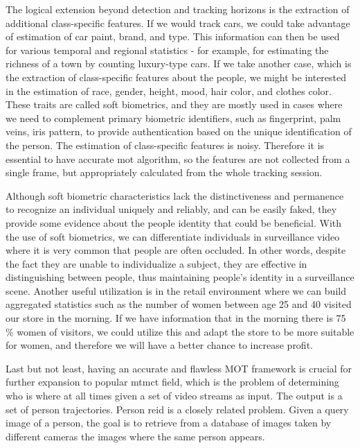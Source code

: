 \begin{introduction}
    The logical extension beyond detection and tracking horizons is the extraction of additional class-specific features. If we would track cars, we could take advantage of estimation of car paint, brand, and type. This information can then be used for various temporal and regional statistics - for example, for estimating the richness of a town by counting luxury-type cars. If we take another case, which is the extraction of class-specific features about the people, we might be interested in the estimation of race, gender, height, mood, hair color, and clothes color. These traits are called soft biometrics, and they are mostly used in cases where we need to complement primary biometric identifiers, such as fingerprint, palm veins, iris pattern, to provide authentication based on the unique identification of the person. The estimation of class-specific features is noisy. Therefore it is essential to have accurate \gls{mot} algorithm, so the features are not collected from a single frame, but appropriately calculated from the whole tracking session.
    
    Although soft biometric characteristics lack the distinctiveness and permanence to recognize an individual uniquely and reliably, and can be easily faked, they provide some evidence about the people identity that could be beneficial. With the use of soft biometrics, we can differentiate individuals in surveillance video where it is very common that people are often occluded. In other words, despite the fact they are unable to individualize a subject, they are effective in distinguishing between people, thus maintaining people's identity in a surveillance scene. Another useful utilization is in the retail environment where we can build aggregated statistics such as the number of women between age 25 and 40 visited our store in the morning. If we have information that in the morning there is 75 \% women of visitors, we could utilize this and adapt the store to be more suitable for women, and therefore we will have a better chance to increase profit.
    
    Last but not least, having an accurate and flawless \gls{MOT} framework is crucial for further expansion to popular \gls{mtmct} field, which is the problem of determining who is where at all times given a set of video streams as input. The output is a set of person trajectories. Person \gls{reid} is a closely related problem. Given a query image of a person, the goal is to retrieve from a database of images taken by different cameras the images where the same person appears. \cite{ristani2016MTMC}
    

\end{introduction}
